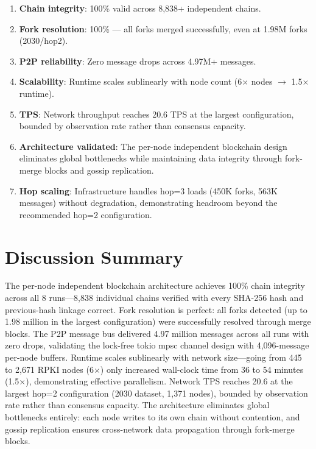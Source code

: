 \documentclass[11pt,a4paper]{article}
\begin{document}
\begin{enumerate}
    \item \textbf{Chain integrity}: 100\% valid across 8,838+ independent chains.
    \item \textbf{Fork resolution}: 100\% --- all forks merged successfully, even at
          1.98M forks (2030/hop2).
    \item \textbf{P2P reliability}: Zero message drops across 4.97M+ messages.
    \item \textbf{Scalability}: Runtime scales sublinearly with node count (6$\times$ nodes
          $\to$ 1.5$\times$ runtime).
    \item \textbf{TPS}: Network throughput reaches 20.6 TPS at the largest configuration,
          bounded by observation rate rather than consensus capacity.
    \item \textbf{Architecture validated}: The per-node independent blockchain design
          eliminates global bottlenecks while maintaining data integrity through
          fork-merge blocks and gossip replication.
    \item \textbf{Hop scaling}: Infrastructure handles hop=3 loads (450K forks, 563K
          messages) without degradation, demonstrating headroom beyond the recommended
          hop=2 configuration.
\end{enumerate}

\section{Discussion Summary}

The per-node independent blockchain architecture achieves 100\% chain integrity across all 8 runs---8,838 individual chains verified with every SHA-256 hash and previous-hash linkage correct. Fork resolution is perfect: all forks detected (up to 1.98 million in the largest configuration) were successfully resolved through merge blocks. The P2P message bus delivered 4.97 million messages across all runs with zero drops, validating the lock-free tokio mpsc channel design with 4,096-message per-node buffers. Runtime scales sublinearly with network size---going from 445 to 2,671 RPKI nodes (6$\times$) only increased wall-clock time from 36 to 54 minutes (1.5$\times$), demonstrating effective parallelism. Network TPS reaches 20.6 at the largest hop=2 configuration (2030 dataset, 1,371 nodes), bounded by observation rate rather than consensus capacity. The architecture eliminates global bottlenecks entirely: each node writes to its own chain without contention, and gossip replication ensures cross-network data propagation through fork-merge blocks.
\end{document}

